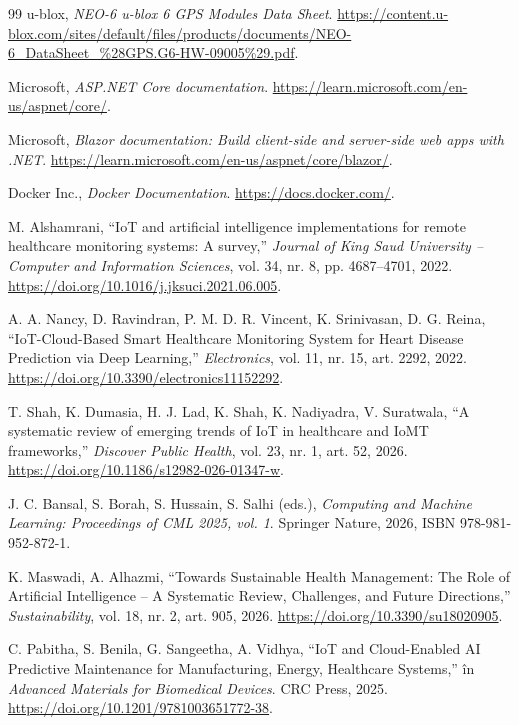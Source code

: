 \documentclass[12pt,a4paper,twoside]{article}
\begin{document}
\begin{thebibliography}{99}
 u-blox, \textit{NEO-6 u-blox 6 GPS Modules Data Sheet}. \url{https://content.u-blox.com/sites/default/files/products/documents/NEO-6_DataSheet_\%28GPS.G6-HW-09005\%29.pdf}.

 Microsoft, \textit{ASP.NET Core documentation}. \url{https://learn.microsoft.com/en-us/aspnet/core/}.

 Microsoft, \textit{Blazor documentation: Build client-side and server-side web apps with .NET}. \url{https://learn.microsoft.com/en-us/aspnet/core/blazor/}.

 Docker Inc., \textit{Docker Documentation}. \url{https://docs.docker.com/}.

 M. Alshamrani, ``IoT and artificial intelligence implementations for remote healthcare monitoring systems: A survey,'' \textit{Journal of King Saud University -- Computer and Information Sciences}, vol. 34, nr. 8, pp. 4687--4701, 2022. \url{https://doi.org/10.1016/j.jksuci.2021.06.005}.

 A. A. Nancy, D. Ravindran, P. M. D. R. Vincent, K. Srinivasan, D. G. Reina, ``IoT-Cloud-Based Smart Healthcare Monitoring System for Heart Disease Prediction via Deep Learning,'' \textit{Electronics}, vol. 11, nr. 15, art. 2292, 2022. \url{https://doi.org/10.3390/electronics11152292}.

 T. Shah, K. Dumasia, H. J. Lad, K. Shah, K. Nadiyadra, V. Suratwala, ``A systematic review of emerging trends of IoT in healthcare and IoMT frameworks,'' \textit{Discover Public Health}, vol. 23, nr. 1, art. 52, 2026. \url{https://doi.org/10.1186/s12982-026-01347-w}.

 J. C. Bansal, S. Borah, S. Hussain, S. Salhi (eds.), \textit{Computing and Machine Learning: Proceedings of CML 2025, vol. 1}. Springer Nature, 2026, ISBN 978-981-952-872-1.

 K. Maswadi, A. Alhazmi, ``Towards Sustainable Health Management: The Role of Artificial Intelligence -- A Systematic Review, Challenges, and Future Directions,'' \textit{Sustainability}, vol. 18, nr. 2, art. 905, 2026. \url{https://doi.org/10.3390/su18020905}.

 C. Pabitha, S. Benila, G. Sangeetha, A. Vidhya, ``IoT and Cloud-Enabled AI Predictive Maintenance for Manufacturing, Energy, Healthcare Systems,'' în \textit{Advanced Materials for Biomedical Devices}. CRC Press, 2025. \url{https://doi.org/10.1201/9781003651772-38}.


\end{thebibliography}
\end{document}
